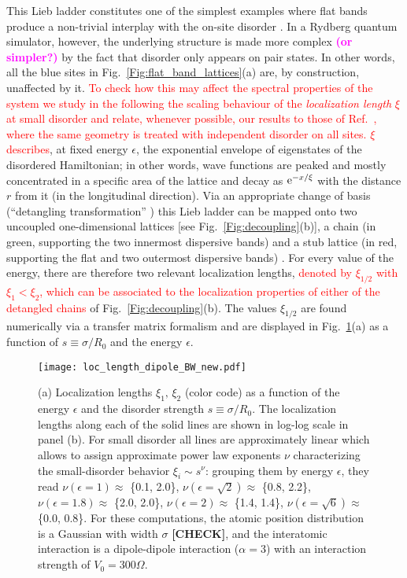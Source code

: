 \documentclass[prl,aps,twocolumn,showpacs,superscriptaddress,longbibliography]{revtex4-1}
\newcommand{\rme}[1]{{\rm{e}}^{#1}}
\newcommand{\changer}[1]{\textcolor{red}{#1}}
\newcommand{\tochange}[1]{\textcolor{magenta}{#1}}
\newcommand{\mm}[1]{{\tochange{\footnotesize{\bf (#1)}}}}
\begin{document}
This Lieb ladder constitutes one of the simplest examples where flat bands produce a non-trivial interplay with the on-site disorder \cite{Leykam2017}. In a Rydberg quantum simulator, however, the underlying structure is made more complex \mm{or simpler?} by the fact that disorder only appears on pair states. In other words, all the blue sites in Fig.~\ref{Fig:flat_band_lattices}(a) are, by construction, unaffected by it. \changer{To check how this may affect the spectral properties of the system we study in the following the scaling behaviour of the \emph{localization length} $\xi$ at small disorder and relate, whenever possible, our results to those of Ref.~\cite{Leykam2017}, where the same geometry is treated with independent disorder on all sites. $\xi$ describes}, at fixed energy $\epsilon$, the exponential envelope of eigenstates of the disordered Hamiltonian; in other words, wave functions are peaked and mostly concentrated in a specific area of the lattice and decay as $\rme{-x/\xi}$ with the distance $r$ from it (in the longitudinal direction).
%
Via an appropriate change of basis (``detangling transformation'' \cite{a_Flach_EPL_14,Leykam2017}) this Lieb ladder can be mapped onto two uncoupled one-dimensional lattices [see Fig.~\ref{Fig:decoupling}(b)], a chain (in green, supporting the two innermost dispersive bands) and a stub lattice (in red, supporting the flat and two outermost dispersive bands) \cite{SM}.
%
For every value of the energy, there are therefore two relevant localization lengths, \changer{denoted by $\xi_{1/2}$ with $\xi_1 < \xi_2$, which can be associated to the localization properties of either of the detangled chains} of Fig.~\ref{Fig:decoupling}(b). The values $\xi_{1/2}$ are found numerically via a transfer matrix formalism and are displayed in Fig.~\ref{Fig:2D_loc_length}(a) as a function of $s \equiv \sigma / R_0$ and the energy $\epsilon$.
\begin{figure}
\texttt{[image: loc\_length\_dipole\_BW\_new.pdf]}
\caption{(a) Localization lengths $\xi_1,\,\xi_2$ (color code) as a function of the energy $\epsilon$ and the disorder strength $s \equiv \sigma / R_0$.
The localization lengths along each of the solid lines are shown in log-log scale in panel (b). For small disorder all lines are approximately linear which allows to assign approximate power law exponents $\nu$ characterizing the small-disorder behavior $\xi_i \sim s^\nu$: grouping them by energy $\epsilon$, they read $\nu\left(\epsilon = 1\right) \approx$ \{0.1, 2.0\}, $\nu\left(\epsilon = \sqrt{2}\right)\approx$ \{0.8, 2.2\}, $\nu\left(\epsilon = 1.8\right)\approx$ \{2.0, 2.0\}, $\nu\left(\epsilon = 2\right)\approx$ \{1.4, 1.4\}, $\nu\left(\epsilon = \sqrt{6}\right)\approx$ \{0.0, 0.8\}. For these computations, the atomic position distribution is a Gaussian with width $\sigma$ \textbf{[CHECK]}, and the interatomic interaction is a dipole-dipole interaction ($\alpha = 3$) with an interaction strength of $V_0 = 300\Omega$.}
 \label{Fig:2D_loc_length}
\end{figure}
\end{document}
